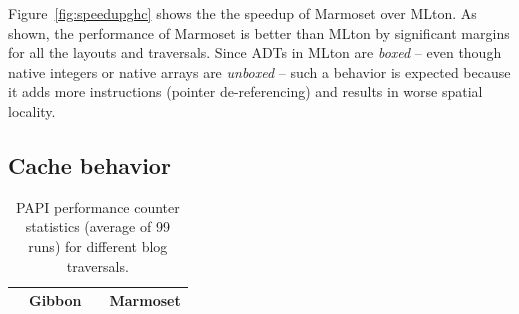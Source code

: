 \documentclass[acmsmall,review,anonymous]{acmart}\settopmatter{printfolios=true,printccs=false,printacmref=false}
\newcommand{\Figref}[1]{Figure~\ref{#1}\xspace}
\newcommand{\system}{{\sc Marmoset}\xspace}
\newcommand{\gibbon}{{\sc Gibbon}\xspace}
\newcommand{\mlton}{{\sc MLton}\xspace}
\newcommand{\ra}[1]{\renewcommand{\arraystretch}{#1}}
\begin{document}
\Figref{fig:speedupghc} shows the the speedup of \system over \mlton.
As shown, the performance of \system is better than \mlton by significant margins for all the layouts and traversals.
Since ADTs in \mlton are \textit{boxed} -- even though native integers or native arrays are \textit{unboxed} -- such a behavior is expected 
because it adds more instructions (pointer de-referencing) and results in worse spatial locality.


\subsection{Cache behavior}\label{subsec:cache}



\begin{table}
    \small
	\setlength{\tabcolsep}{2pt} \centering
	\ra{1}
	\caption{PAPI performance counter statistics (average of 99 runs) for different blog traversals.}
	\begin{tabular}{@{}p{0.6in}rcrcrcrcrcrcrcrcr@{}}\toprule
	  & \multicolumn{13}{|c|}{{\gibbon}} &
      & \multicolumn{3}{c|}{{\system}}\\ \midrule


\end{tabular}
\end{table}
\end{document}
